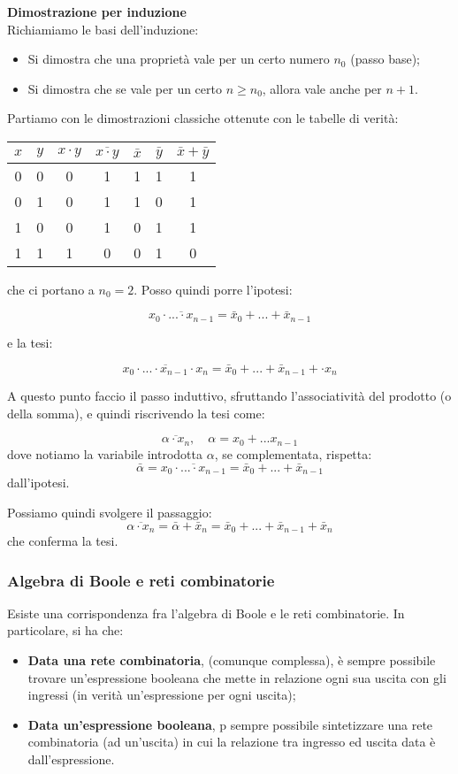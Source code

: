 \documentclass[a4paper,11pt]{article}
\begin{document}
\noindent
\textbf{\textsf{Dimostrazione per induzione}} \\
Richiamiamo le basi dell'induzione:
\begin{itemize}
	\item Si dimostra che una proprietà vale per un certo numero $n_0$ (passo base);
	\item Si dimostra che se vale per un certo $n \geq n_0$, allora vale anche per $n + 1$.
\end{itemize}

Partiamo con le dimostrazioni classiche ottenute con le tabelle di verità:

\begin{table}[H]
	\center
	\begin{tabular} { c  c | c | c | c | c | c }
		$x$ & $y$ & $ x \cdot y $ & $\overline{x \cdot y}$ & $\bar{x}$ & $\bar{y}$ & $\bar{x} + \bar{y}$ \\ 
		\hline 
		0 & 0 & 0 & 1 & 1 & 1 & 1 \\  
		0 & 1 & 0 & 1 & 1 & 0 & 1 \\ 
		1 & 0 & 0 & 1 & 0 & 1 & 1 \\ 
		1 & 1 & 1 & 0 & 0 & 1 & 0
	\end{tabular}
\end{table}

che ci portano a $n_0 = 2$.
Posso quindi porre l'ipotesi:

$$
\overline{x_0 \cdot ... \cdot x_{n-1}} = \bar{x}_0 + ... + \bar{x}_{n-1}
$$

e la tesi:

$$
\overline{x_0 \cdot ... \cdot x_{n-1} \cdot x_n} = \bar{x}_0 + ... + \bar{x}_{n-1} + \cdot x_n
$$

A questo punto faccio il passo induttivo, sfruttando l'associatività del prodotto (o della somma), e quindi riscrivendo la tesi come:

$$
\overline{\alpha \cdot x_n}, \quad \alpha = x_0 + ... x_{n-1} 
$$
dove notiamo la variabile introdotta $\alpha$, se complementata, rispetta:
$$
\bar{\alpha} = \overline{x_0 \cdot ... \cdot x_{n-1}} = \bar{x}_0 + ... + \bar{x}_{n-1}
$$
dall'ipotesi.

Possiamo quindi svolgere il passaggio:
$$
\overline{\alpha \cdot x_n} = \bar{\alpha} + \bar{x}_n =  \bar{x}_0 + ... + \bar{x}_{n-1} + \bar{x}_n
$$
che conferma la tesi.

\subsubsection{Algebra di Boole e reti combinatorie}
Esiste una corrispondenza fra l'algebra di Boole e le reti combinatorie.
In particolare, si ha che:
\begin{itemize}
	\item \textbf{Data una rete combinatoria}, (comunque complessa), è sempre possibile trovare un'espressione booleana che mette in relazione ogni sua uscita con gli ingressi (in verità un'espressione per ogni uscita);
	\item \textbf{Data un'espressione booleana}, p sempre possibile sintetizzare una rete combinatoria (ad un'uscita) in cui la relazione tra ingresso ed uscita data è dall'espressione.
\end{itemize}
\end{document}
